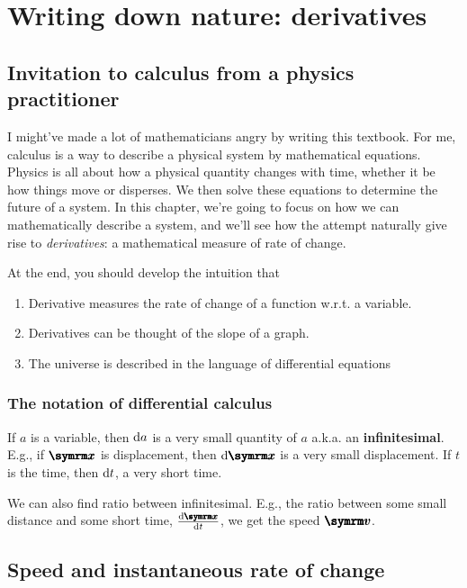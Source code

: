 \chapter{Writing down nature: derivatives}
\label{sec:derivatives}


\section{Invitation to calculus from a physics practitioner}

I might've made a lot of mathematicians angry by writing this textbook. For me, calculus is a way to describe a physical system by mathematical equations. Physics is all about how a physical quantity changes with time, whether it be how things move or disperses. We then solve these equations to determine the future of a system. In this chapter, we're going to focus on how we can mathematically describe a system, and we'll see how the attempt naturally give rise to \emph{derivatives}: a mathematical measure of rate of change.

At the end, you should develop the intuition that
\begin{enumerate}[noitemsep]
    \item Derivative measures the rate of change of a function w.r.t. a variable.
    \item Derivatives can be thought of the slope of a graph.
    \item The universe is described in the language of differential equations
\end{enumerate}

\subsection{The notation of differential calculus}
\label{sec:notation_of_calculus_derivative}

If $a$ is a variable, then $\odif{a}$ is a very small quantity of $a$ a.k.a. an \textbf{infinitesimal}. E.g., if $\vv{x}$ is displacement, then $\odif{\vv{x}}$ is a very small displacement. If $t$ is the time, then $\odif{t}$, a very short time.

We can also find ratio between infinitesimal. E.g., the ratio between some small distance and some short time, $\odv{\vv{x}}{t}$, we get the speed $\vv{v}$.

\section{Speed and instantaneous rate of change}
\label{sec:speedandinstantaneousrateofchange}

